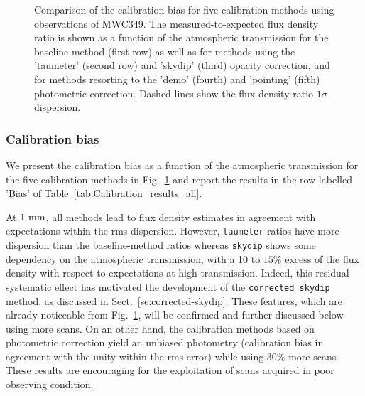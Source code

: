 \begin{figure}[!thbp]
\begin{center}
    \vspace{-0.3cm}
    \caption[Calibration bias comparison]{Comparison of the
        calibration bias for five calibration methods using
          observations of MWC349.
       The measured-to-expected flux density ratio is shown as a
      function of the atmospheric transmission for the baseline method
      (first row) as well as for methods using the 'taumeter' (second
      row) and 'skydip' (third) opacity correction, and for methods
      resorting to the 'demo' (fourth) and 'pointing' (fifth)
      photometric correction. Dashed lines
      show the flux density ratio $1 \sigma $ dispersion.}
    \label{fig:mwc349_obstau_others}
  \end{center}
\end{figure}

\subsubsection{Calibration bias}
\label{se:calibration_bias_all}

We present the calibration bias as a function of the atmospheric
transmission for the five calibration methods in
Fig.~\ref{fig:mwc349_obstau_others} and report the results in the row
labelled 'Bias' of Table~\ref{tab:Calibration_results_all}.

At $1~\rm{mm}$, all methods lead to flux density estimates in
agreement with expectations within the rms dispersion. However,
{\tt taumeter} ratios have more dispersion than the baseline-method
ratios whereas {\tt skydip} shows some dependency on the atmospheric
transmission, with a 10 to $15\%$ excess of the flux density with
respect to expectations at high transmission. Indeed, this residual
systematic effect has motivated the development of the {\tt corrected
  skydip} method, as discussed in
Sect.~\ref{se:corrected-skydip}. These features, which are
already noticeable from Fig.~\ref{fig:mwc349_obstau_others}, will be
confirmed and further discussed below using more scans. On an other hand,
the calibration methods based on photometric correction yield an
unbiased photometry (calibration bias in agreement with the unity
within the rms error) while using $30\%$ more scans. These results are
encouraging for the exploitation of scans acquired in poor
observing condition.

